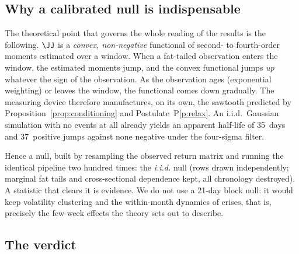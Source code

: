 \subsection{Why a calibrated null is indispensable}

The theoretical point that governs the whole reading of the results is the
following. $\JJ$ is a \emph{convex, non-negative} functional of second- to
fourth-order moments estimated over a window. When a fat-tailed observation
enters the window, the estimated moments jump, and the convex functional jumps
\emph{up} whatever the sign of the observation. As the observation ages
(exponential weighting) or leaves the window, the functional comes down
gradually. The measuring device therefore manufactures, on its own, the
sawtooth predicted by Proposition~\ref{prop:conditioning} and
Postulate~P\ref{p:relax}. An i.i.d.\ Gaussian simulation with no events at all
already yields an apparent half-life of 35~days and 37~positive jumps against
none negative under the four-sigma filter.

Hence a null, built by resampling the observed return matrix and running the
identical pipeline two hundred times: the \emph{i.i.d.} null (rows drawn
independently; marginal fat tails and cross-sectional dependence kept, all
chronology destroyed). A statistic that clears it is evidence. We do not use a
21-day block null: it would keep volatility clustering and the within-month
dynamics of crises, that is, precisely the few-week effects the theory sets out
to describe.

\subsection{The verdict}

